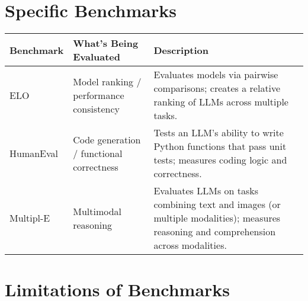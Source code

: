 \documentclass[a4paper, 12pt]{article}
\begin{document}
\vspace{1em}

\section*{Specific Benchmarks}

\begin{tabularx}{\textwidth}{|>{\hsize=0.2\hsize}X|>{\hsize=0.3\hsize}X|>{\hsize=0.5\hsize}X|}
\hline
\textbf{Benchmark} & \textbf{What’s Being Evaluated} & \textbf{Description} \\
\hline
ELO & Model ranking / performance consistency & Evaluates models via pairwise comparisons; creates a relative ranking of LLMs across multiple tasks. \\
\hline
HumanEval & Code generation / functional correctness & Tests an LLM’s ability to write Python functions that pass unit tests; measures coding logic and correctness. \\
\hline
Multipl-E & Multimodal reasoning & Evaluates LLMs on tasks combining text and images (or multiple modalities); measures reasoning and comprehension across modalities. \\
\hline
\end{tabularx}

\vspace{1em}

\section*{Limitations of Benchmarks}
\end{document}
